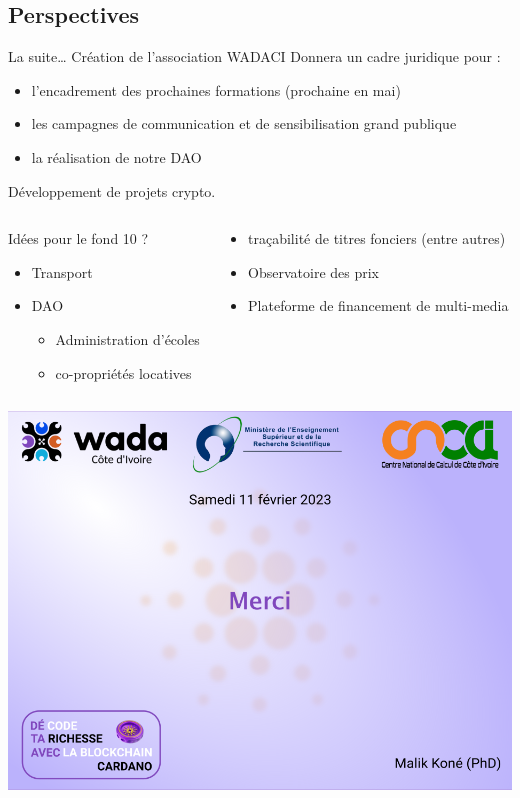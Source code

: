 \documentclass[presentation]{beamer}
\begin{document}
\subsection{Perspectives}
\label{sec:orgc6b72f0}
\begin{frame}[label={sec:org6cc5f83}]{La suite\ldots{}  Création de l'association WADACI}
Donnera un cadre juridique pour :
\begin{itemize}
\item l'encadrement des prochaines formations (prochaine en mai)
\item les campagnes de communication et de sensibilisation grand publique
\item la réalisation de notre DAO
\end{itemize}
\begin{block}{Développement de projets crypto.}
\begin{columns}
\begin{column}{0.5\columnwidth}
\begin{block}{Idées pour le fond 10 ?}
\begin{itemize}
\item Transport
\item DAO 
\begin{itemize}
\item Administration d'écoles
\item co-propriétés locatives
\end{itemize}
\end{itemize}
\end{block}
\end{column}
\begin{column}{0.5\columnwidth}
\begin{block}{}
\begin{itemize}
\item traçabilité de titres fonciers (entre autres)
\item Observatoire des prix
\item Plateforme de financement de multi-media
\end{itemize}
\end{block}
\end{column}
\end{columns}
\end{block}
\end{frame}
\begin{frame}[label={sec:org02aac31}]{}
\begin{center}
\includegraphics[height=\textheight]{Images/merci_wadaci.png}
\end{center}
\end{frame}
\end{document}
